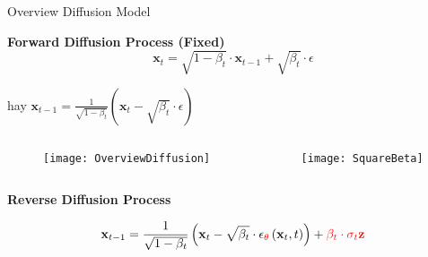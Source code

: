 \begin{frame}{Overview Diffusion Model}
%	
%		
%	
%	
%		

\textbf{Forward Diffusion Process (Fixed)}
\begin{equation}
	\mathbf{x}_t=\sqrt{1- \beta_t} \cdot \mathbf{x}_{t-1}+\sqrt{\beta_t} \cdot \epsilon
\end{equation}

hay $\mathbf{x}_{t-1} = \frac{1}{\sqrt{1-\beta_{t}}} (\mathbf{x}_t - \sqrt{\beta_t} \cdot \epsilon) $


\begin{columns}
\begin{column}{0.8\textwidth}
\begin{figure}
	\centering
	\texttt{[image: OverviewDiffusion]}
\end{figure}
\end{column}

\begin{column}{0.2\textwidth}
\texttt{[image: SquareBeta]}
\end{column}
\end{columns}


\textbf{Reverse Diffusion Process}

\begin{equation}
	\mathbf{x}_{t-1}=\frac{1}{\sqrt{1- \beta_t}}\left(\mathbf{x}_t-\sqrt{\beta_t} \cdot \epsilon_{\color{red}{\theta}}\left(\mathbf{x}_t, t\right)\right)+\color{red}{\beta_t \cdot \sigma_t \mathbf{z}} \color{black}{}
\end{equation}

\end{frame}
	
